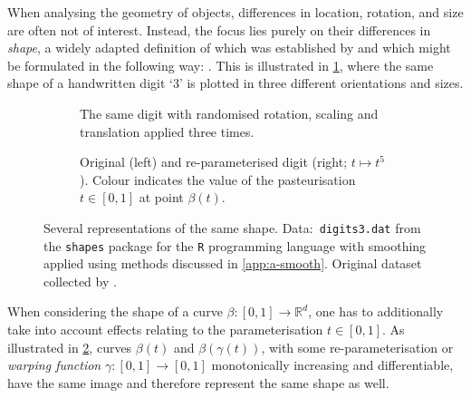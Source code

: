 When analysing the geometry of objects, differences in location, rotation, and size are often not of interest.
Instead, the focus lies purely on their differences in  \textit{shape}, a widely adapted definition of which was established by \cite{Kendall1977} and which might be formulated in the following way: .
This is illustrated in \cref{fig:1-eucl}, where the same shape of a handwritten digit \enquote*{3} is plotted in three different orientations and sizes.
\begin{figure}
  \centering
  \begin{subfigure}{.48\textwidth}
    \centering
    \caption{The same digit with randomised rotation, scaling and translation applied three times.\\}
    \label{fig:1-eucl}
  \end{subfigure}\hfill%
  \begin{subfigure}{.48\textwidth}
    \centering
    \caption{Original (left) and re-parameterised digit (right; $t \mapsto t^5$). Colour indicates the value of the pasteurisation $t \in [0,1]$ at point $\beta(t)$.}
    \label{fig:1-warp}
  \end{subfigure}
  \caption{Several representations of the same shape. Data:\ \texttt{digits3.dat} from the \texttt{shapes} package \parencite{shapes} for the \texttt{R} programming language \parencite{R} with smoothing applied using methods discussed in \cref{app:a-smooth}. Original dataset collected by \cite{Anderson1997}.}
  \label{fig:1-shape}
\end{figure}
When considering the shape of a curve $\beta : [0,1] \rightarrow \mathbb{R}^d$, one has to additionally take into account effects relating to the parameterisation $t \in [0,1]$.
As illustrated in \cref{fig:1-warp}, curves $\beta(t)$ and $\beta(\gamma(t))$, with some re-parameterisation or \textit{warping function} $\gamma : [0,1] \rightarrow [0,1]$ monotonically increasing and differentiable, have the same image and therefore represent the same shape as well.

